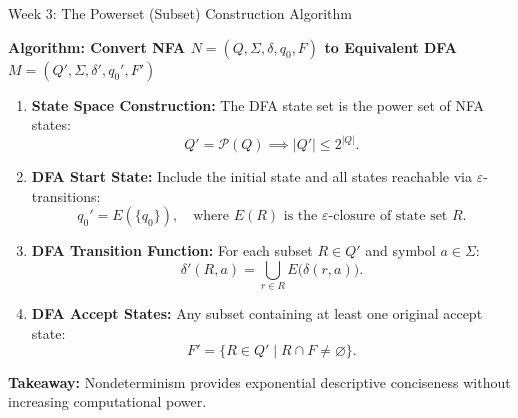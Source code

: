 \documentclass[aspectratio=169, 10pt]{beamer}
\begin{document}
\begin{frame}{Week 3: The Powerset (Subset) Construction Algorithm}
  \begin{tcolorbox}[conceptcard]
    {\bfseries\footnotesize\color{gimpanavy} Algorithm: Convert NFA $N=(Q, \Sigma, \delta, q_0, F)$ to Equivalent DFA $M=(Q', \Sigma, \delta', q_0', F')$}
    \vspace{0.06cm}
    \begin{enumerate}\setlength{\itemsep}{2pt}\footnotesize
      \item \textbf{State Space Construction:} The DFA state set is the power set of NFA states:
        $$Q' = \mathcal{P}(Q) \implies |Q'| \le 2^{|Q|}.$$
      \item \textbf{DFA Start State:} Include the initial state and all states reachable via $\varepsilon$-transitions:
        $$q_0' = E(\{q_0\}), \quad \text{where } E(R) \text{ is the } \varepsilon\text{-closure of state set } R.$$
      \item \textbf{DFA Transition Function:} For each subset $R \in Q'$ and symbol $a \in \Sigma$:
        $$\delta'(R, a) = \bigcup_{r \in R} E\bigl(\delta(r, a)\bigr).$$
      \item \textbf{DFA Accept States:} Any subset containing at least one original accept state:
        $$F' = \bigl\{R \in Q' \;\big|\; R \cap F \neq \varnothing\bigr\}.$$
    \end{enumerate}
  \end{tcolorbox}

  \vspace{0.08cm}
  \begin{center}
    {\footnotesize\color{gimpaslate}\textbf{Takeaway:} Nondeterminism provides exponential descriptive conciseness without increasing computational power.}
  \end{center}
\end{frame}
\end{document}
